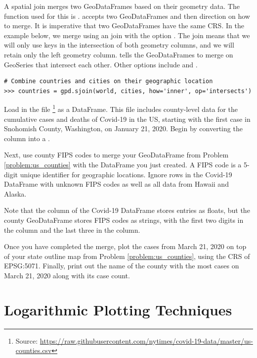 A spatial join merges two GeoDataFrames based on their geometry data.
The function used for this is .
 accepts two GeoDataFrames and then direction on how to merge.
It is imperative that two GeoDataFrames have the same CRS.
In the example below, we merge using an  join with the option .
The  join means that we will only use keys in the intersection of both geometry columns, and we will retain only the left geometry column.
 tells the GeoDataFrames to merge on GeoSeries that intersect each other.
Other options include  and .

\begin{lstlisting}
# Combine countries and cities on their geographic location
>>> countries = gpd.sjoin(world, cities, how='inner', op='intersects')
\end{lstlisting}

\begin{problem}
Load in the file \footnote{Source: \url{https://raw.githubusercontent.com/nytimes/covid-19-data/master/us-counties.csv}} as a DataFrame.
This file includes county-level data for the cumulative cases and deaths of Covid-19 in the US, starting with the first case in Snohomish County, Washington, on January 21, 2020.
Begin by converting the  column into a .

Next, use county FIPS codes to merge your GeoDataFrame from Problem \ref{problem:us_counties} with the DataFrame you just created.
A FIPS code is a 5-digit unique identifier for geographic locations.
Ignore rows in the Covid-19 DataFrame with unknown FIPS codes as well as all data from Hawaii and Alaska.

Note that the  column of the Covid-19 DataFrame stores entries as floats, but the county GeoDataFrame stores FIPS codes as strings, with the first two digits in the  column and the last three in the  column.

Once you have completed the merge, plot the cases from March 21, 2020 on top of your state outline map from Problem \ref{problem:us_counties}, using the CRS of EPSG:5071.
Finally, print out the name of the county with the most cases on March 21, 2020 along with its case count.
\label{problem:merge_covid}
\end{problem}

\section*{Logarithmic Plotting Techniques} %

